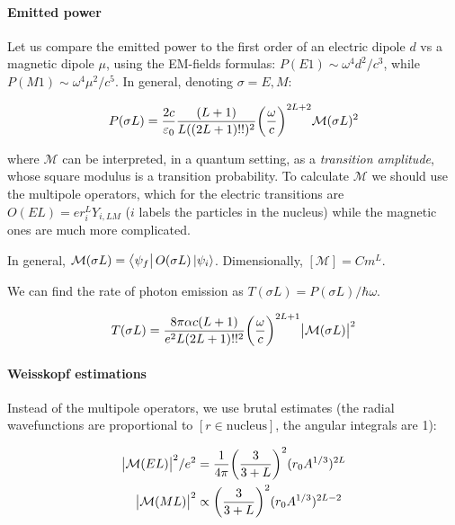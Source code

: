 \documentclass{article}
\begin{document}
\paragraph{Emitted power}

Let us compare the emitted power to the first order of an electric dipole \(d\) vs a magnetic dipole \(\mu\), using the EM-fields formulas: \(P(E1) \sim \omega^4 d^2 / c^3\), while \(P(M1) \sim \omega^4 \mu^2 / c^5\). In general, denoting \(\sigma = E, M\):

\begin{equation}
    P(\sigma L) = \frac{2c}{\varepsilon_0} \frac{(L+1)}{L((2L+1)!!)^2} \qty(\frac{\omega}{c})^{2L+2} \mathcal M (\sigma L)^2
\end{equation}

where \(\mathcal M\) can be interpreted, in a quantum setting, as a \emph{transition amplitude}, whose square modulus is a transition probability.
To calculate \(\mathcal M\) we should use the multipole operators, which for the electric transitions are \(O(EL) = e r^L_i Y_{i,LM}\) (\(i\) labels the particles in the nucleus) while the magnetic ones are much more complicated.

In general, \(\mathcal M (\sigma L) = \bra{\psi_f} O(\sigma L) \ket{\psi_i} \).
Dimensionally, \([\mathcal M] = C m^L\).

We can find the rate of photon emission as \(T(\sigma L) = P(\sigma L) / \hbar \omega\).

\begin{equation}
    T(\sigma L ) =
    \frac{8 \pi \alpha c (L+1)}{e^2 L (2L+1)!!^2} \qty(\frac{\omega }{c})^{2L+1}
    \abs{\mathcal M (\sigma L)}^2
\end{equation}

\paragraph{Weisskopf estimations}

Instead of the multipole operators, we use brutal estimates (the radial wavefunctions are proportional to \([r \in \text{nucleus}]\), the angular integrals are 1):

\begin{subequations}
\begin{align}
    \abs{\mathcal M (EL)}^2/e^2 &= \frac{1}{4 \pi} \qty(\frac{3}{3+L}) ^2 (r_0 A^{1/3})^{2L} \\
    \abs{\mathcal M (ML)}^2 &\propto \qty(\frac{3}{3+L}) ^2 (r_0 A^{1/3})^{2L-2}
\end{align}
\end{subequations}
\end{document}
